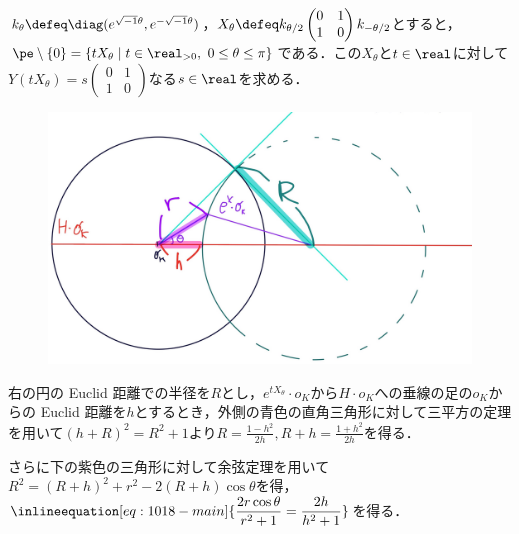 \begin{pfwn}{}


  $k_{\theta} \defeq \diag(e^{\sqrt{-1}\theta},e^{-\sqrt{-1}\theta}) $，$X_{\theta} \defeq k_{\theta/2}
  \begin{pmatrix}
    0 & 1 \\ 1 & 0
  \end{pmatrix}
  k_{-\theta/2}$とすると，$\pe\setminus\{0\} =  \{tX_{\theta}\mid t\in \real_{>0},\ 0\leq \theta\leq \pi\}$である．この$X_{\theta} $と$t\in \real$に対して$Y(tX_{\theta} ) = s
  \begin{pmatrix}
    0 & 1 \\ 1 & 0
  \end{pmatrix}
  $なる$s\in \real $を求める．


   
  \begin{figure}[H]
    \centering
    \includegraphics[scale=0.08]{../graph/yosou-eg-1.jpg}
    \caption{}
    \label{fig:yosou-eg-1}
  \end{figure}

  右の円の Euclid 距離での半径を$R$とし，$e^{tX_{\theta}}\cdot o_K $から$H\cdot o_K$への垂線の足の$o_K$からの Euclid 距離を$h$とするとき，外側の青色の直角三角形に対して三平方の定理を用いて$(h+R)^2 = R^2 +  1 $より$R = \frac{1-h^2}{2h} , R+h = \frac{1+h^2}{2h}  $を得る．

  さらに下の紫色の三角形に対して余弦定理を用いて$R^2 = (R+h)^2 + r^2 - 2(R+h) \cos\theta  $を得，$\inlineequation[eq:1018-main]{\dfrac{2r\cos\theta}{r^2 + 1} = \dfrac{2h}{h^2 + 1} }$を得る．

  
\end{pfwn}

